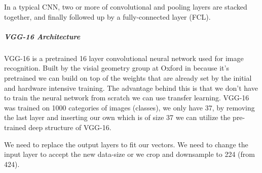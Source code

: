 In a typical CNN, two or more of convolutional and pooling layers are stacked together, and finally followed up by a fully-connected layer (FCL).

\subparagraph{VGG-16 Architecture}
VGG-16 is a pretrained 16 layer convolutional neural network used for image recognition. Built by the visial geometry group at Oxford in \citeyear{vgg16-arxiv} \cite{vgg16-arxiv} because it's pretrained we can build on top of the weights that are already set by the initial and hardware intensive training. The advantage behind this is that we don't have to train the neural network from scratch we can use transfer learning. VGG-16 was trained on 1000 categories of images (classes), we only have 37, by removing the last layer and inserting our own which is of size 37 we can utilize the pre-trained deep structure of VGG-16.


We need to replace the output layers to fit our vectors.
We need to change the input layer to accept the new data-size or we crop and downsample to 224 (from 424).
